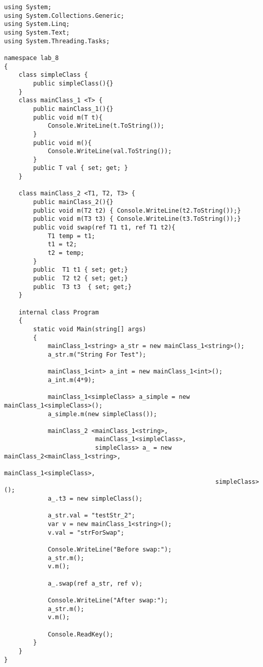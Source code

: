 \begin{lstlisting}[language={[Sharp]C}]
using System;
using System.Collections.Generic;
using System.Linq;
using System.Text;
using System.Threading.Tasks;

namespace lab_8
{
    class simpleClass {
        public simpleClass(){}
    }
    class mainClass_1 <T> {
        public mainClass_1(){}
        public void m(T t){
            Console.WriteLine(t.ToString());
        }
        public void m(){ 
            Console.WriteLine(val.ToString()); 
        }
        public T val { set; get; }
    }

    class mainClass_2 <T1, T2, T3> {
        public mainClass_2(){}
        public void m(T2 t2) { Console.WriteLine(t2.ToString());}
        public void m(T3 t3) { Console.WriteLine(t3.ToString());}
        public void swap(ref T1 t1, ref T1 t2){
            T1 temp = t1;
            t1 = t2;
            t2 = temp;
        }
        public  T1 t1 { set; get;}
        public  T2 t2 { set; get;}
        public  T3 t3  { set; get;}
    }

    internal class Program
    {
        static void Main(string[] args)
        {
            mainClass_1<string> a_str = new mainClass_1<string>();
            a_str.m("String For Test");
            
            mainClass_1<int> a_int = new mainClass_1<int>();
            a_int.m(4*9);

            mainClass_1<simpleClass> a_simple = new mainClass_1<simpleClass>();
            a_simple.m(new simpleClass());

            mainClass_2 <mainClass_1<string>, 
                         mainClass_1<simpleClass>, 
                         simpleClass> a_ = new mainClass_2<mainClass_1<string>, 
                                                          mainClass_1<simpleClass>, 
                                                          simpleClass>();
            a_.t3 = new simpleClass();

            a_str.val = "testStr_2";
            var v = new mainClass_1<string>();
            v.val = "strForSwap";

            Console.WriteLine("Before swap:");
            a_str.m();
            v.m();
            
            a_.swap(ref a_str, ref v);

            Console.WriteLine("After swap:");
            a_str.m();
            v.m();
           
            Console.ReadKey();
        }
    }
}

\end{lstlisting}